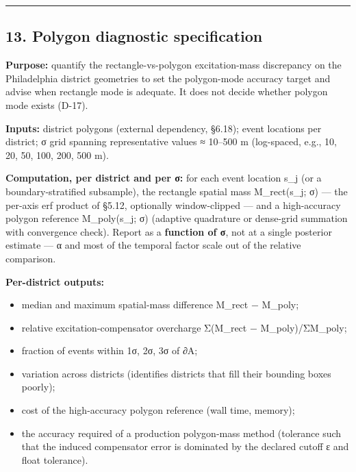 \documentclass[
  10pt,
]{article}
\providecommand{\tightlist}{%
  \setlength{\itemsep}{0pt}\setlength{\parskip}{0pt}}
\begin{document}
\begin{center}\rule{0.5\linewidth}{0.5pt}\end{center}

\hypertarget{polygon-diagnostic-specification}{%
\subsection{13. Polygon diagnostic specification}\label{polygon-diagnostic-specification}}

\textbf{Purpose:} quantify the rectangle-vs-polygon excitation-mass discrepancy on the Philadelphia district geometries to set the polygon-mode accuracy target and advise when rectangle mode is adequate. It does not decide whether polygon mode exists (D-17).

\textbf{Inputs:} district polygons (external dependency, §6.18); event locations per district; σ grid spanning representative values ≈ 10--500 m (log-spaced, e.g., 10, 20, 50, 100, 200, 500 m).

\textbf{Computation, per district and per σ:} for each event location s\_j (or a boundary-stratified subsample), the rectangle spatial mass M\_rect(s\_j; σ) --- the per-axis erf product of §5.12, optionally window-clipped --- and a high-accuracy polygon reference M\_poly(s\_j; σ) (adaptive quadrature or dense-grid summation with convergence check). Report as a \textbf{function of σ}, not at a single posterior estimate --- α and most of the temporal factor scale out of the relative comparison.

\textbf{Per-district outputs:}

\begin{itemize}
\tightlist
\item
  median and maximum spatial-mass difference M\_rect − M\_poly;
\item
  relative excitation-compensator overcharge Σ(M\_rect − M\_poly)/ΣM\_poly;
\item
  fraction of events within 1σ, 2σ, 3σ of ∂A;
\item
  variation across districts (identifies districts that fill their bounding boxes poorly);
\item
  cost of the high-accuracy polygon reference (wall time, memory);
\item
  the accuracy required of a production polygon-mass method (tolerance such that the induced compensator error is dominated by the declared cutoff ε and float tolerance).
\end{itemize}
\end{document}

